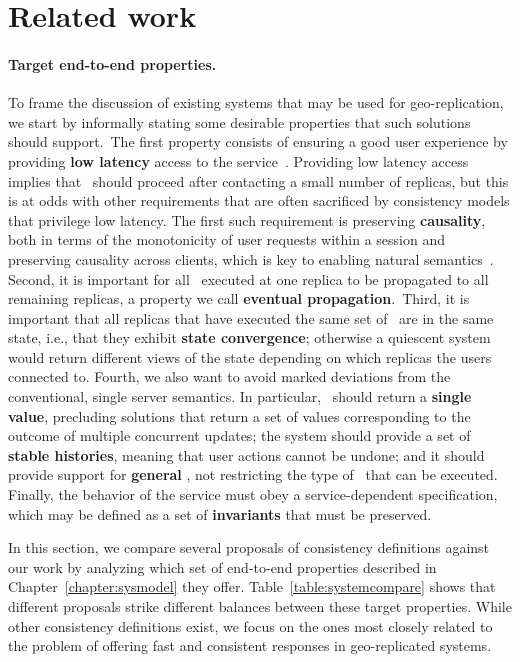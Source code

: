 \section{Related work}%
\label{ch:redblue:sect:related}
\paragraph{Target end-to-end properties.}
To frame the discussion of existing systems that may be used
for geo-rep\-li\-cat\-ion, we start by informally stating some
desirable properties that such solutions should support.\ The first property consists of ensuring a good user experience by
providing \textbf{low latency} access to the
service~\cite{Schurman2009latency}. Providing low latency access implies
that \operations\ should proceed after contacting a small number of
replicas, but this is at odds with other requirements that are often sacrificed by consistency
models that privilege low latency. The first such requirement is preserving
\textbf{caus\-al\-ity}, both in terms of the monotonicity of user requests
within a session and preserving causality across clients, which is key
to enabling natural semantics~\cite{Petersen1997Flexible}.  Second, it
is important for all \operations\
executed at one replica to be
propagated to all remaining replicas, a property we call
\textbf{eventual propagation}.\ Third, it is important that all
replicas that have executed the same set of \operations\ are in the
same state, i.e., that they exhibit \textbf{state convergence}; otherwise a quiescent system would return different views of the state
depending on which replicas the users connected to. Fourth, we also
want to avoid marked deviations from the conventional, single server
semantics. In particular, \operations\ should return a \textbf{single
  value}, precluding solutions that return a set of values
corresponding to the outcome of multiple concurrent updates; the
system should provide a set of \textbf{stable histories}, meaning that
user actions cannot be undone; and it should provide support for
\textbf{general \operations}, not restricting the type of
\transactions\ that can be executed.  Finally, the behavior of the
service must obey a service-dependent specification, which may be
defined as a set of \textbf{invariants} that must be preserved.
\fi

In this section, we compare several proposals of consistency definitions against our work
by analyzing which set of end-to-end properties described in Chapter~\ref{chapter:sysmodel} they offer.
Table~\ref{table:systemcompare} shows that different proposals strike different balances between
these target properties. While other consistency
definitions exist, we focus on the ones most closely related to the
problem of offering fast and consistent responses in geo-replicated
systems.

